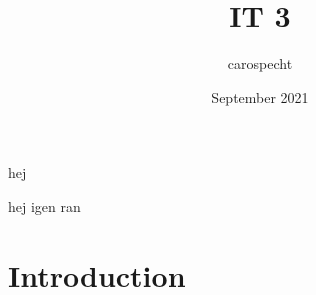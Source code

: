 \documentclass{article}
\title{IT 3}
\author{carospecht }
\date{September 2021}
\begin{document}
hej

hej igen
ran

\maketitle

\section{Introduction}
\end{document}

